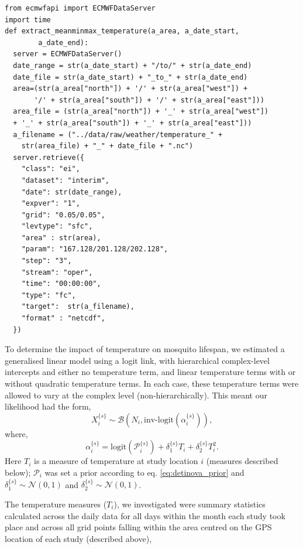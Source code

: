 \documentclass[12pt]{article}
\begin{document}
{\begin{verbatim}
from ecmwfapi import ECMWFDataServer
import time
def extract_meanminmax_temperature(a_area, a_date_start,
		a_date_end):
  server = ECMWFDataServer()
  date_range = str(a_date_start) + "/to/" + str(a_date_end)
  date_file = str(a_date_start) + "_to_" + str(a_date_end)
  area=(str(a_area["north"]) + '/' + str(a_area["west"]) +
       '/' + str(a_area["south"]) + '/' + str(a_area["east"])) 
  area_file = (str(a_area["north"]) + '_' + str(a_area["west"])
  + '_' + str(a_area["south"]) + '_' + str(a_area["east"]))
  a_filename = ("../data/raw/weather/temperature_" +
  	str(area_file) + "_" + date_file + ".nc")
  server.retrieve({
    "class": "ei",
    "dataset": "interim",
    "date": str(date_range),
    "expver": "1",
    "grid": "0.05/0.05",
    "levtype": "sfc",
    "area" : str(area),
    "param": "167.128/201.128/202.128",
    "step": "3",
    "stream": "oper",
    "time": "00:00:00",
    "type": "fc",
    "target":  str(a_filename),
    "format" : "netcdf",
  })
\end{verbatim}

To determine the impact of temperature on mosquito lifespan, we estimated a generalised linear model using a logit link, with hierarchical complex-level intercepts and either no temperature term, and linear temperature terms with or without quadratic temperature terms. In each case, these temperature terms were allowed to vary at the complex level (non-hierarchically). This meant our likelihood had the form,
%
\begin{equation}
X_i^{\{s\}} \sim \mathcal{B}(N_i, \text{inv-logit}(\alpha_i^{\{s\}})),
\end{equation}
%
where,
%
\begin{equation}
\alpha_i^{\{s\}} = \text{logit} (\mathcal{P}_i^{\{s\}}) + \delta_1^{\{s\}} T_i + \delta_2^{\{s\}} T_i^2.
\end{equation}
%
Here $T_i$ is a measure of temperature at study location $i$ (measures described below); $\mathcal{P}_i$ was set a prior according to eq. \eqref{eq:detinova_prior} and $\delta_1^{\{s\}}\sim \mathcal{N}(0, 1)$ and $\delta_2^{\{s\}}\sim \mathcal{N}(0, 1)$.

The temperature measures ($T_i$), we investigated were summary statistics calculated across the daily data for all days within the month each study took place and across all grid points falling within the area centred on the GPS location of each study (described above),

}
\end{document}
